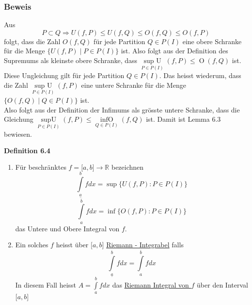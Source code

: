 \subsubsection*{Beweis}
Aus $$P\subset Q \Rightarrow U(f,P) \leq U(f,Q) \leq O(f,Q) \leq O(f,P)$$ folgt, dass die Zahl $O(f,Q)$ für jede Partition $Q\in P(I)$ eine obere Schranke für die Menge $\{ U(f,P)\mid P\in P(I)\}$ ist. Also folgt aus der Definition des Supremums als kleinste obere Schranke, dass $\mathop {\sup {\text{ }}U}\limits_{P \in P(I)} (f,P) \le \mathop O(f,Q)$ ist. \\
\newpage
Diese Ungleichung gilt für jede Partition $Q\in P(I)$. Das heisst wiederum, dass die Zahl $\mathop {\sup {\text{ }}U}\limits_{P \in P(I)} (f,P)$ eine untere Schranke für die Menge $\{ O(f,Q)\mid Q \in P(I)\} $ ist.\\

Also folgt aus der Definition der Infimums als grösste untere Schranke, dass die Gleichung $\mathop {\sup U}\limits_{P \in P(I)} (f,P) \le \mathop {\inf O}\limits_{Q \in P(I)} (f,Q)$ ist. Damit ist Lemma 6.3 bewiesen.
\begin{framed}
\centerline{\textbf{Definition 6.4}}
\begin{enumerate}[\indent 1)]
\item Für beschränktes $f=\lbrack a,b \rbrack\rightarrow \mathbb{R}$ bezeichnen 
$$\int\limits_{\underline{a}}^b {fdx = \sup \{ U(f,P):P \in P(I)\} }$$
$$\int\limits_{a}^{\overline{b}} {fdx = \inf \{ O(f,P):P \in P(I)\} }$$
das Untere und Obere Integral von $f$.
\item Ein solches $f$ heisst über $\lbrack a,b\rbrack$ \underline{Riemann - Integrabel} falls $$\int\limits_{\underline{a}}^b {fdx}  = \int\limits_a^{\overline{b}} {fdx} $$ In diesem Fall heisst $A = \int\limits_a^b {fdx} $ das \underline{Riemann Integral von $f$} über den Interval $\lbrack a,b\rbrack$
\end{enumerate}
\end{framed}

